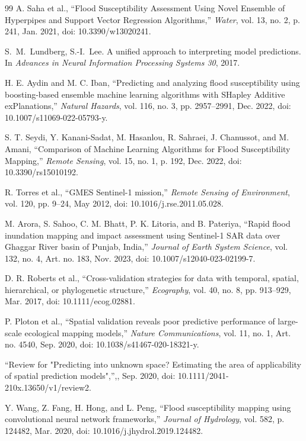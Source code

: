 \begin{thebibliography}{99}
A. Saha et al., ``Flood Susceptibility Assessment Using Novel Ensemble of Hyperpipes and Support Vector Regression Algorithms,'' \emph{Water}, vol. 13, no. 2, p. 241, Jan. 2021, doi: 10.3390/w13020241.

S.~M.~Lundberg, S.-I.~Lee. A unified approach to interpreting model predictions. In \emph{Advances in Neural Information Processing Systems 30}, 2017.

H. E. Aydin and M. C. Iban, ``Predicting and analyzing flood susceptibility using boosting-based ensemble machine learning algorithms with SHapley Additive exPlanations,'' \emph{Natural Hazards}, vol. 116, no. 3, pp. 2957--2991, Dec. 2022, doi: 10.1007/s11069-022-05793-y.

S. T. Seydi, Y. Kanani-Sadat, M. Hasanlou, R. Sahraei, J. Chanussot, and M. Amani, ``Comparison of Machine Learning Algorithms for Flood Susceptibility Mapping,'' \emph{Remote Sensing}, vol. 15, no. 1, p. 192, Dec. 2022, doi: 10.3390/rs15010192.

R. Torres et al., ``GMES Sentinel-1 mission,'' \emph{Remote Sensing of Environment}, vol. 120, pp. 9--24, May 2012, doi: 10.1016/j.rse.2011.05.028.

M. Arora, S. Sahoo, C. M. Bhatt, P. K. Litoria, and B. Pateriya, ``Rapid flood inundation mapping and impact assessment using Sentinel-1 SAR data over Ghaggar River basin of Punjab, India,'' \emph{Journal of Earth System Science}, vol. 132, no. 4, Art. no. 183, Nov. 2023, doi: 10.1007/s12040-023-02199-7.

D. R. Roberts et al., ``Cross-validation strategies for data with temporal, spatial, hierarchical, or phylogenetic structure,'' \emph{Ecography}, vol. 40, no. 8, pp. 913--929, Mar. 2017, doi: 10.1111/ecog.02881.

P. Ploton et al., ``Spatial validation reveals poor predictive performance of large-scale ecological mapping models,'' \emph{Nature Communications}, vol. 11, no. 1, Art. no. 4540, Sep. 2020, doi: 10.1038/s41467-020-18321-y.

``Review for "Predicting into unknown space? Estimating the area of applicability of spatial prediction models",'',, Sep. 2020, doi: 10.1111/2041-210x.13650/v1/review2.

Y. Wang, Z. Fang, H. Hong, and L. Peng, ``Flood susceptibility mapping using convolutional neural network frameworks,'' \emph{Journal of Hydrology}, vol. 582, p. 124482, Mar. 2020, doi: 10.1016/j.jhydrol.2019.124482.


\end{thebibliography}
